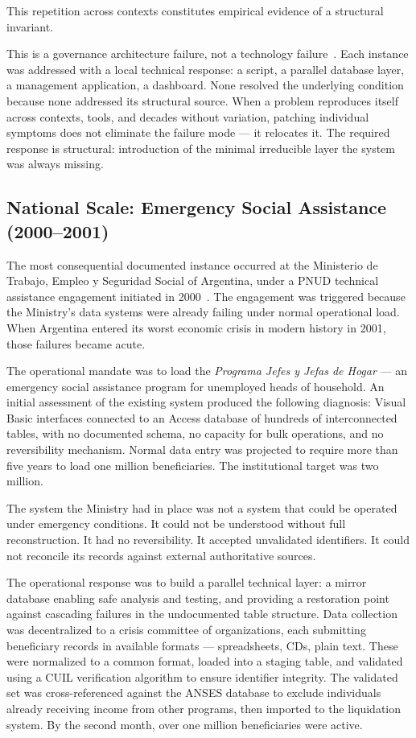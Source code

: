\documentclass[conference]{IEEEtran}
\begin{document}
This repetition across contexts constitutes empirical evidence of a structural invariant.

This is a governance architecture failure, not a technology failure~\cite{trist1951}. Each instance was addressed with a local technical response: a script, a parallel database layer, a management application, a dashboard. None resolved the underlying condition because none addressed its structural source. When a problem reproduces itself across contexts, tools, and decades without variation, patching individual symptoms does not eliminate the failure mode --- it relocates it. The required response is structural: introduction of the minimal irreducible layer the system was always missing.

\subsection{National Scale: Emergency Social Assistance (2000--2001)}

The most consequential documented instance occurred at the Ministerio de Trabajo, Empleo y Seguridad Social of Argentina, under a PNUD technical assistance engagement initiated in 2000~\cite{pnud2001}. The engagement was triggered because the Ministry's data systems were already failing under normal operational load. When Argentina entered its worst economic crisis in modern history in 2001, those failures became acute.

The operational mandate was to load the \emph{Programa Jefes y Jefas de Hogar} --- an emergency social assistance program for unemployed heads of household. An initial assessment of the existing system produced the following diagnosis: Visual Basic interfaces connected to an Access database of hundreds of interconnected tables, with no documented schema, no capacity for bulk operations, and no reversibility mechanism. Normal data entry was projected to require more than five years to load one million beneficiaries. The institutional target was two million.

The system the Ministry had in place was not a system that could be operated under emergency conditions. It could not be understood without full reconstruction. It had no reversibility. It accepted unvalidated identifiers. It could not reconcile its records against external authoritative sources.

The operational response was to build a parallel technical layer: a mirror database enabling safe analysis and testing, and providing a restoration point against cascading failures in the undocumented table structure. Data collection was decentralized to a crisis committee of organizations, each submitting beneficiary records in available formats --- spreadsheets, CDs, plain text. These were normalized to a common format, loaded into a staging table, and validated using a CUIL verification algorithm to ensure identifier integrity. The validated set was cross-referenced against the ANSES database to exclude individuals already receiving income from other programs, then imported to the liquidation system. By the second month, over one million beneficiaries were active.
\end{document}
